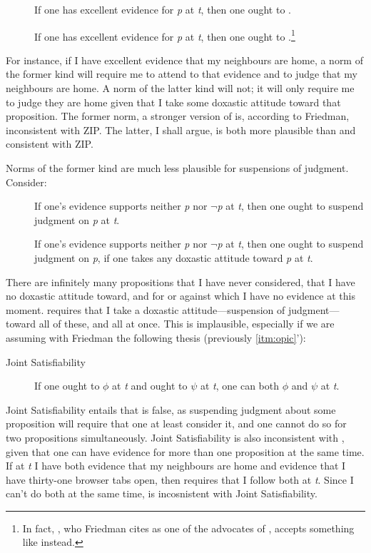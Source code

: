 \documentclass[12pt]{article}
\begin{document}
\begin{description}
    \item[\eo] If one has excellent evidence for \textit{p} at \textit{t}, then one ought to \jud{}.
    \item[\eoc] If one has excellent evidence for \textit{p} at \textit{t}, then one ought to \judif{}.\footnote{In fact, \textcite[679]{feldman_ethics_2000}, who Friedman cites as one of the advocates of \eo{}, accepts something like \eoc{} instead.}
\end{description}
%
For instance, if I have excellent evidence that my neighbours are home, a norm of the former kind will require me to attend to that evidence and to judge that my neighbours are home. A norm of the latter kind will not; it will only require me to judge they are home given that I take some doxastic attitude toward that proposition. The former norm, a stronger version of \ep{} is, according to Friedman, inconsistent with ZIP. The latter, I shall argue, is both more plausible than \eo{} and consistent with ZIP.

Norms of the former kind are much less plausible for suspensions of judgment. Consider:

\begin{description}
    \item[\so] If one's evidence supports neither \textit{p} nor $\neg $\textit{p} at \textit{t}, then one ought to suspend judgment on \textit{p} at \textit{t}.
    \item[\soc] If one's evidence supports neither \textit{p} nor $\neg $\textit{p} at \textit{t}, then one ought to suspend judgment on \textit{p}, if one takes any doxastic attitude toward \textit{p} at \textit{t}.
\end{description}
%
There are infinitely many propositions that I have never considered, that I have no doxastic attitude toward, and for or against which I have no evidence at this moment. \so{} requires that I take a doxastic attitude---suspension of judgment---toward all of these, and all at once. This is implausible, especially if we are assuming with Friedman the following thesis (previously \ref{itm:opic}'):

%
\newcommand{\js}{Joint Satisfiability}
\begin{description}
    \item[\js{}] If one ought to $\phi$ at \textit{t} and ought to $\psi$ at \textit{t}, one can both $\phi$ and $\psi$ at \textit{t}.
\end{description}
%
\js{} entails that \so{} is false, as suspending judgment about some proposition will require that one at least consider it, and one cannot do so for two propositions simultaneously. \js{} is also inconsistent with \eo{}, given that one can have evidence for more than one proposition at the same time. If at \textit{t} I have both evidence that my neighbours are home and evidence that I have thirty-one browser tabs open, then \eo{} requires that I follow both at \textit{t}. Since I can't do both at the same time, \eo{} is incosnistent with \js{}.
\end{document}
